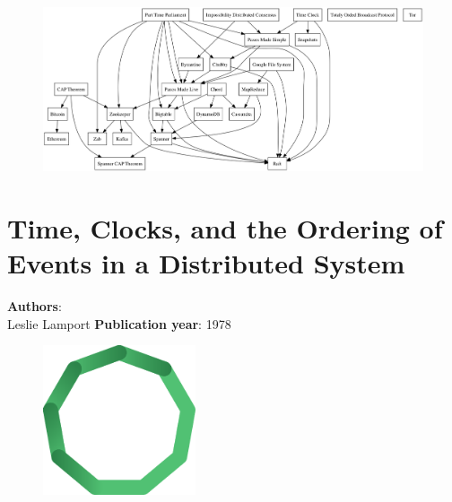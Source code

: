 \documentclass[11pt,fleqn]{book} %
\begin{document}
\vspace*{5mm}

\begin{figure}[h]
\centering
\includegraphics[width=1\textwidth]{dependency}
\end{figure}

\chapter{Time, Clocks, and the Ordering of Events in a Distributed System}
\vspace*{-7mm}
\Large \textbf{Authors}: \\
Leslie Lamport
\newline\newline
\textbf{Publication year}: 1978
\begin{figure}[b]
    \centering
    \includegraphics[width=0.4\textwidth]{distributed-systems.pdf}
\end{figure}

\end{document}
